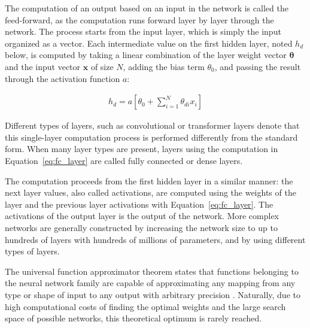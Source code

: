 \documentclass{article}
\begin{document}
The computation of an output based on an input in the network is called the 
feed-forward, as the computation runs forward layer by layer through the 
network. The process starts from the input layer, which is simply the input 
organized as a vector. Each intermediate value on the first hidden layer, noted $h_d$ below,
is computed by taking a linear combination of the layer weight vector $\mathbf{\theta}$ and 
the input vector $\mathbf{x}$ of size $N$, adding the 
bias term $\theta_0$, and passing the result through the activation function $a$:

\begin{align}
    h_d = a\left[ \theta_{0} + \sum_{i=1}^{N}\theta_{di}x_{i} \right]
\label{eq:fc_layer}
\end{align}

Different types of layers, such as convolutional or transformer layers 
denote that this single-layer computation process is performed differently from 
the standard form. When many layer types are present, layers using the computation
in Equation~\ref{eq:fc_layer} are called fully connected or dense layers.

The computation proceeds from the first hidden layer in a similar manner: 
the next layer values, also called activations, are computed using the weights of 
the layer and the previous layer activations with Equation~\ref{eq:fc_layer}.
The activations of the output layer is the output of the network.
More complex networks are generally constructed by increasing the network size to up to 
hundreds of layers with hundreds of millions of parameters, and by using
different types of layers.

The universal function approximator theorem states that functions belonging to the 
neural network family are capable of approximating any mapping from any type or shape of input
to any output with arbitrary precision \cite{princebook}. Naturally, due to high computational 
costs of finding the optimal weights and the large search space of possible networks, 
this theoretical optimum is rarely reached.
\end{document}
